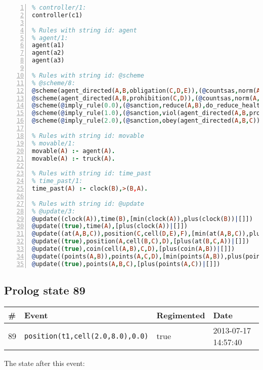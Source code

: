 \documentclass[11pt]{article}\usepackage[utf8]{inputenc}\usepackage{geometry}
\begin{document}
\begin{lstlisting}[language=Prolog, numbers=left]
% Rules with string id: controller
% controller/1:
controller(c1)

% Rules with string id: agent
% agent/1:
agent(a1)
agent(a2)
agent(a3)

% Rules with string id: @scheme
% @scheme/8:
@scheme(agent_directed(A,B,obligation(C,D,E)),(@countsas,norm(A,B,F,obligation(C,D,E)),F),false,(listTrue(C)),(time_past(D)),false,[plus(viol(agent_directed(A,B,obligation(C,D,E))))|[]],[plus(obey(agent_directed(A,B,obligation(C,D,E))))|[]])
@scheme(agent_directed(A,B,prohibition(C,D)),(@countsas,norm(A,B,E,prohibition(C,D)),E),(listTrue(C)),false,(false),false,[plus(viol(agent_directed(A,B,prohibition(C,D))))|[]],[plus(obey(agent_directed(A,B,prohibition(C,D))))|[]])
@scheme(@imply_rule(0.0),(@sanction,reduce(A,B),do_reduce_health(A,B),notifyAgent(A,changed(status))),true,false,false,false,[min(reduce(A,B))|[]],[])
@scheme(@imply_rule(1.0),(@sanction,viol(agent_directed(A,B,prohibition(C,D))),do_sanction(D)),true,false,false,false,[min(viol(agent_directed(A,B,prohibition(C,D))))|[]],[])
@scheme(@imply_rule(2.0),(@sanction,obey(agent_directed(A,B,C))),true,false,false,false,[min(obey(agent_directed(A,B,C)))|[]],[])

% Rules with string id: movable
% movable/1:
movable(A) :- agent(A).
movable(A) :- truck(A).

% Rules with string id: time_past
% time_past/1:
time_past(A) :- clock(B),>(B,A).

% Rules with string id: @update
% @update/3:
@update((clock(A)),time(B),[min(clock(A)),plus(clock(B))|[]])
@update((true),time(A),[plus(clock(A))|[]])
@update((at(A,B,C)),position(C,cell(D,E),F),[min(at(A,B,C)),plus(at(D,E,C))|[]])
@update((true),position(A,cell(B,C),D),[plus(at(B,C,A))|[]])
@update((true),coin(cell(A,B),C,D),[plus(coin(A,B))|[]])
@update((points(A,B)),points(A,C,D),[min(points(A,B)),plus(points(A,D))|[]])
@update((true),points(A,B,C),[plus(points(A,C))|[]])

\end{lstlisting}
\clearpage 
\subsection{Prolog state 89}
\begin{table}[ht]
\centering 
\begin{tabular}{l l l l} 
\textbf{\#} & \textbf{Event} & \textbf{Regimented} & \textbf{Date} \\ [0.5ex] 
\hline
89&\texttt{position(t1,cell(2.0,8.0),0.0)}&true&2013-07-17 14:57:40\\ [1ex] \hline\end{tabular}
\end{table}
The state after this event:
\end{document}
